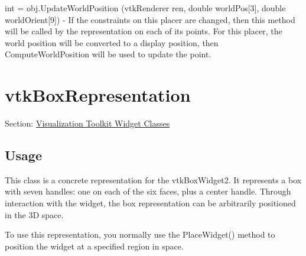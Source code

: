 \begin{DoxyItemize}
\item {\ttfamily int = obj.\-Update\-World\-Position (vtk\-Renderer ren, double world\-Pos\mbox{[}3\mbox{]}, double world\-Orient\mbox{[}9\mbox{]})} -\/ If the constraints on this placer are changed, then this method will be called by the representation on each of its points. For this placer, the world position will be converted to a display position, then Compute\-World\-Position will be used to update the point.  
\end{DoxyItemize}\hypertarget{vtkwidgets_vtkboxrepresentation}{}\section{vtk\-Box\-Representation}\label{vtkwidgets_vtkboxrepresentation}
Section\-: \hyperlink{sec_vtkwidgets}{Visualization Toolkit Widget Classes} \hypertarget{vtkwidgets_vtkxyplotwidget_Usage}{}\subsection{Usage}\label{vtkwidgets_vtkxyplotwidget_Usage}
This class is a concrete representation for the vtk\-Box\-Widget2. It represents a box with seven handles\-: one on each of the six faces, plus a center handle. Through interaction with the widget, the box representation can be arbitrarily positioned in the 3\-D space.

To use this representation, you normally use the Place\-Widget() method to position the widget at a specified region in space.

